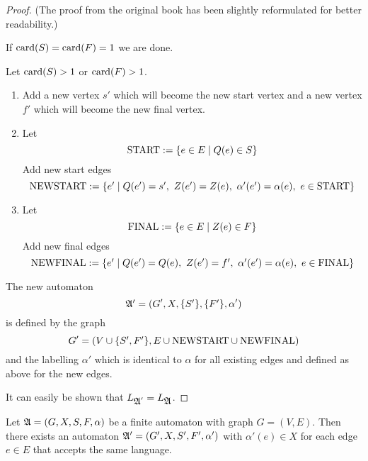 \begin{proof}
(The proof from the original book has been slightly reformulated for better
readability.)

If $\mathrm{card}({S}) = \mathrm{card}({F}) = 1$ we are done.

Let $\mathrm{card}({S}) > 1$ or $\mathrm{card}({F}) > 1$.

\newcommand{\startedges}{\mathrm{START}}
\newcommand{\newstartedges}{\mathrm{NEWSTART}}
\newcommand{\finaledges}{\mathrm{FINAL}}
\newcommand{\newfinaledges}{\mathrm{NEWFINAL}}
\begin{enumerate}
  \item Add a new vertex $s'$ which will become the new start vertex and a new 
  vertex $f'$ which will become the new final vertex.
  
  \item Let	\[ \startedges := \setof{e \in E \mid Q(e) \in S} \]
	Add new start edges 
	\[ \newstartedges := \setof{e' \mid Q(e') = s',\ Z(e') = Z(e),\ \alpha'(e') =
	\alpha(e),\ e \in \startedges} \]

	\item	Let	\[ \finaledges := \setof{e \in E \mid Z(e) \in F} \]
	Add new final edges
	\[ \newfinaledges := \setof{e' \mid Q(e') = Q(e),\ Z(e') = f',\ \alpha'(e') =
	\alpha(e),\ e \in \finaledges} \]
\end{enumerate}

The new automaton 
\[ \mbox{$\mathfrak{A'}$} = (G', X, \mbox{$\{S'\}$}, \mbox{$\{F'\}$}, \alpha') \]
is defined by the graph
\[ G' = (V \cup \setof{S', F'}, E \cup \newstartedges \cup \newfinaledges) \]
and the labelling $\alpha'$ which is identical to $\alpha$ for all existing 
edges and defined as above for the new edges.

It can easily be shown that $L_{\mbox{$\mathfrak{A}$}'} = L_{\mbox{$\mathfrak{A}$}}$.
\end{proof}

\bigskip
\begin{lemma}
Let $\mbox{$\mathfrak{A}$} = (G, X, S, F, \alpha)$ be a finite automaton with graph $G = (V,
E)$. Then there exists an automaton $\mbox{$\mathfrak{A'}$} = (G', X, S', F', \alpha')$ with
$\alpha'(e) \in X$ for each edge $e \in E$ that accepts the same language.
\end{lemma}

